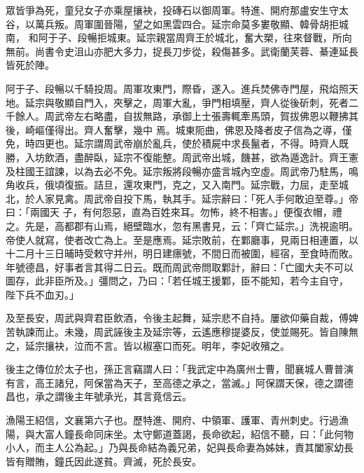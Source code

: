 \begin{pinyinscope}
 眾皆爭為死，童兒女子亦乘屋攘袂，投磚石以御周軍。特進、開府那盧安生守太谷，以萬兵叛。周軍圍晉陽，望之如黑雲四合。延宗命莫多婁敬顯、韓骨胡拒城南，
 和阿于子、段暢拒城東。延宗親當周齊王於城北，奮大槊，往來督戰，所向無前。尚書令史沮山亦肥大多力，捉長刀步從，殺傷甚多。武衛蘭芙蓉、綦連延長皆死於陣。



 阿于子、段暢以千騎投周。周軍攻東門，際昏，遂入。進兵焚佛寺門屋，飛焰照天地。延宗與敬顯自門入，夾擊之，周軍大亂，爭門相填壓，齊人從後斫刺，死者二千餘人。周武帝左右略盡，自拔無路，承御上士張壽輒牽馬頭，賀拔佛恩以鞭拂其後，崎嶇僅得出。齊人奮擊，幾中
 焉。城東阨曲，佛恩及降者皮子信為之導，僅免，時四更也。延宗謂周武帝崩於亂兵，使於積屍中求長鬣者，不得。時齊人既勝，入坊飲酒，盡醉臥，延宗不復能整。周武帝出城，饑甚，欲為遁逸計。齊王憲及柱國王誼諫，以為去必不免。延宗叛將段暢亦盛言城內空虛。周武帝乃駐馬，鳴角收兵，俄頃復振。詰旦，還攻東門，克之，又入南門。延宗戰，力屈，走至城北，於人家見禽。周武帝自投下馬，執其手。延宗辭曰：「死人手何敢迫至尊。」帝曰：「兩國天
 子，有何怨惡，直為百姓來耳。勿怖，終不相害。」便復衣帽，禮之。先是，高都郡有山焉，絕壁臨水，忽有黑書見，云：「齊亡延宗。」洗視逾明。帝使人就寫，使者改亡為上。至是應焉。延宗敗前，在鄴廳事，見兩日相連置，以十二月十三日晡時受敕守并州，明日建瘭號，不間日而被圍，經宿，至食時而敗。年號德昌，好事者言其得二日云。既而周武帝問取鄴計，辭曰：「亡國大夫不可以圖存，此非臣所及。」彊問之，乃曰：「若任城王援鄴，臣不能知，若今主自守，
 陛下兵不血刃。」



 及至長安，周武與齊君臣飲酒，令後主起舞，延宗悲不自持。屢欲仰藥自裁，傅婢苦執諫而止。未幾，周武誣後主及延宗等，云遙應穆提婆反，使並賜死。皆自陳無之，延宗攘袂，泣而不言。皆以椒塞口而死。明年，李妃收殯之。



 後主之傳位於太子也，孫正言竊謂人曰：「我武定中為廣州士曹，聞襄城人曹普演有言，高王諸兒，阿保當為天子，至高德之承之，當滅。」阿保謂天保，德之謂德昌也，承之謂後主年號承光，其言竟信云。



 漁陽王紹信，文襄第六子也。歷特進、開府、中領軍、護軍、青州刺史。行過漁陽，與大富人鐘長命同床坐。太守鄭道蓋謁，長命欲起，紹信不聽，曰：「此何物小人，而主人公為起。」乃與長命結為義兄弟，妃與長命妻為姊妹，責其闔家幼長皆有贈賄，鐘氏因此遂貧。齊滅，死於長安。



\end{pinyinscope}